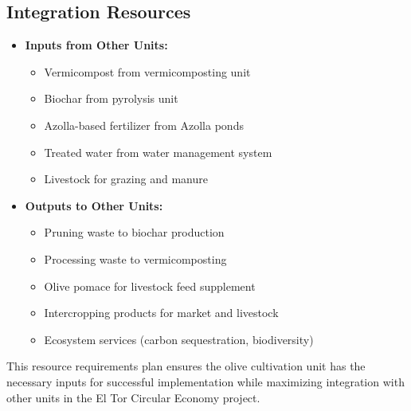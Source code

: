 \subsection{Integration Resources}
\begin{itemize}
    \item \textbf{Inputs from Other Units:}
    \begin{itemize}
        \item Vermicompost from vermicomposting unit
        \item Biochar from pyrolysis unit
        \item Azolla-based fertilizer from Azolla ponds
        \item Treated water from water management system
        \item Livestock for grazing and manure
    \end{itemize}
    \item \textbf{Outputs to Other Units:}
    \begin{itemize}
        \item Pruning waste to biochar production
        \item Processing waste to vermicomposting
        \item Olive pomace for livestock feed supplement
        \item Intercropping products for market and livestock
        \item Ecosystem services (carbon sequestration, biodiversity)
    \end{itemize}
\end{itemize}

This resource requirements plan ensures the olive cultivation unit has the necessary inputs for successful implementation while maximizing integration with other units in the El Tor Circular Economy project.
